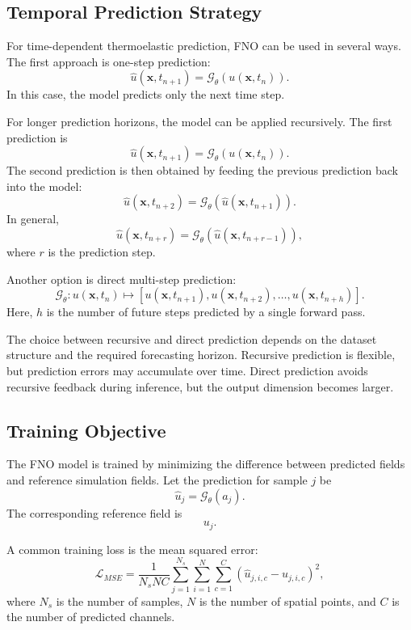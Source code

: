 \documentclass[14pt]{extarticle}
\begin{document}
\subsection{Temporal Prediction Strategy}

For time-dependent thermoelastic prediction, FNO can be used in several ways. The first approach is one-step prediction:
\[
\hat{u}(\mathbf{x}, t_{n+1})
=
\mathcal{G}_{\theta}
\left(
u(\mathbf{x}, t_n)
\right).
\]
In this case, the model predicts only the next time step.

For longer prediction horizons, the model can be applied recursively. The first prediction is
\[
\hat{u}(\mathbf{x}, t_{n+1})
=
\mathcal{G}_{\theta}
\left(
u(\mathbf{x}, t_n)
\right).
\]
The second prediction is then obtained by feeding the previous prediction back into the model:
\[
\hat{u}(\mathbf{x}, t_{n+2})
=
\mathcal{G}_{\theta}
\left(
\hat{u}(\mathbf{x}, t_{n+1})
\right).
\]
In general,
\[
\hat{u}(\mathbf{x}, t_{n+r})
=
\mathcal{G}_{\theta}
\left(
\hat{u}(\mathbf{x}, t_{n+r-1})
\right),
\]
where \(r\) is the prediction step.

Another option is direct multi-step prediction:
\[
\mathcal{G}_{\theta}
:
u(\mathbf{x}, t_n)
\mapsto
\left[
u(\mathbf{x}, t_{n+1}),
u(\mathbf{x}, t_{n+2}),
\ldots,
u(\mathbf{x}, t_{n+h})
\right].
\]
Here, \(h\) is the number of future steps predicted by a single forward pass.

The choice between recursive and direct prediction depends on the dataset structure and the required forecasting horizon. Recursive prediction is flexible, but prediction errors may accumulate over time. Direct prediction avoids recursive feedback during inference, but the output dimension becomes larger.

\subsection{Training Objective}

The FNO model is trained by minimizing the difference between predicted fields and reference simulation fields. Let the prediction for sample \(j\) be
\[
\hat{u}_j
=
\mathcal{G}_{\theta}(a_j).
\]
The corresponding reference field is
\[
u_j.
\]

A common training loss is the mean squared error:
\[
\mathcal{L}_{MSE}
=
\frac{1}{N_s N C}
\sum_{j=1}^{N_s}
\sum_{i=1}^{N}
\sum_{c=1}^{C}
\left(
\hat{u}_{j,i,c}
-
u_{j,i,c}
\right)^2,
\]
where \(N_s\) is the number of samples, \(N\) is the number of spatial points, and \(C\) is the number of predicted channels.
\end{document}
